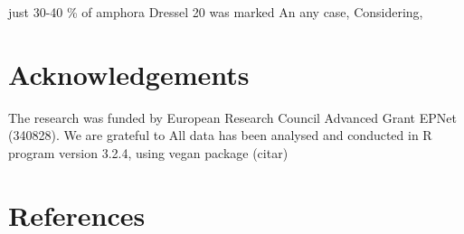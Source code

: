 \documentclass[review]{elsarticle}
\begin{document}
just 30-40 \% of amphora Dressel 20 was marked 
An any case, 
Considering, 

\section{Acknowledgements}

The research was funded by European Research Council Advanced Grant EPNet (340828). We are grateful to 
All data has been analysed and conducted in R program version 3.2.4, using vegan package (citar) 


\section{References}


\end{document}
